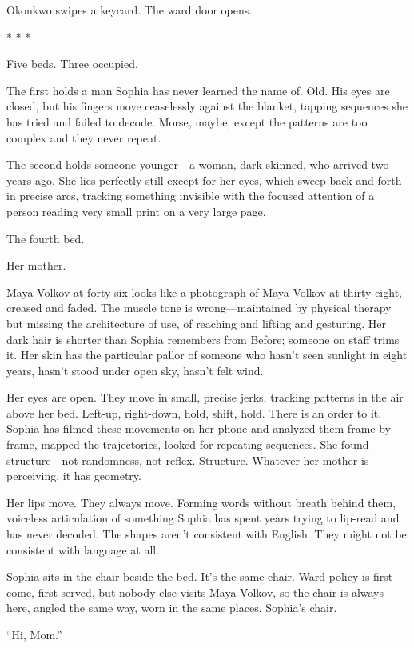 Okonkwo swipes a keycard. The ward door opens.

\begin{center}
* * *
\end{center}

Five beds. Three occupied.

The first holds a man Sophia has never learned the name of. Old. His eyes are closed, but his fingers move ceaselessly against the blanket, tapping sequences she has tried and failed to decode. Morse, maybe, except the patterns are too complex and they never repeat.

The second holds someone younger---a woman, dark-skinned, who arrived two years ago. She lies perfectly still except for her eyes, which sweep back and forth in precise arcs, tracking something invisible with the focused attention of a person reading very small print on a very large page.

The fourth bed.

Her mother.

Maya Volkov at forty-six looks like a photograph of Maya Volkov at thirty-eight, creased and faded. The muscle tone is wrong---maintained by physical therapy but missing the architecture of use, of reaching and lifting and gesturing. Her dark hair is shorter than Sophia remembers from Before; someone on staff trims it. Her skin has the particular pallor of someone who hasn't seen sunlight in eight years, hasn't stood under open sky, hasn't felt wind.

Her eyes are open. They move in small, precise jerks, tracking patterns in the air above her bed. Left-up, right-down, hold, shift, hold. There is an order to it. Sophia has filmed these movements on her phone and analyzed them frame by frame, mapped the trajectories, looked for repeating sequences. She found structure---not randomness, not reflex. Structure. Whatever her mother is perceiving, it has geometry.

Her lips move. They always move. Forming words without breath behind them, voiceless articulation of something Sophia has spent years trying to lip-read and has never decoded. The shapes aren't consistent with English. They might not be consistent with language at all.

Sophia sits in the chair beside the bed. It's the same chair. Ward policy is first come, first served, but nobody else visits Maya Volkov, so the chair is always here, angled the same way, worn in the same places. Sophia's chair.

``Hi, Mom.''

